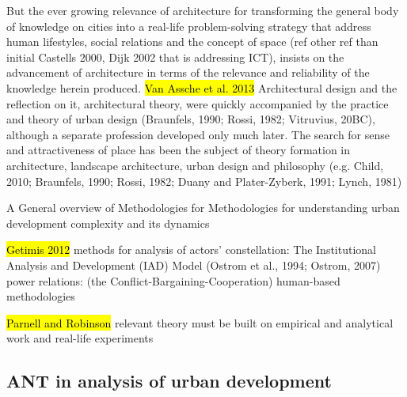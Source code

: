 \documentclass[11pt]{report}
\begin{document}
But the ever growing relevance of architecture for transforming the general body of knowledge on cities into a real-life problem-solving strategy that address human lifestyles, social relations and the concept of space (ref other ref than initial Castells 2000, Dijk 2002 that is addressing ICT), insists on the advancement of architecture in terms of the relevance and reliability of the knowledge herein produced.
\hl{Van Assche et al. 2013}
Architectural design and the reflection on it, architectural theory, were quickly accompanied by the practice and theory of urban design (Braunfels, 1990; Rossi, 1982; Vitruvius, 20BC), although a separate profession developed only much later. 
The search for sense  and attractiveness of place has been the subject of theory formation in architecture, landscape architecture, urban design and philosophy (e.g. Child, 2010; Braunfels, 1990; Rossi, 1982; Duany and Plater-Zyberk, 1991; Lynch, 1981)

A General overview of Methodologies for 
Methodologies for understanding urban development complexity and its dynamics

\hl{Getimis 2012}
methods for analysis of actors' constellation:
The Institutional Analysis and Development (IAD) Model (Ostrom et al., 1994; Ostrom, 2007)
power relations: (the Conﬂict-Bargaining-Cooperation)
human-based methodologies

\hl{Parnell and Robinson }
relevant theory must be built on empirical and analytical work and real-life experiments

\subsection{ANT in analysis of urban development}
\end{document}

